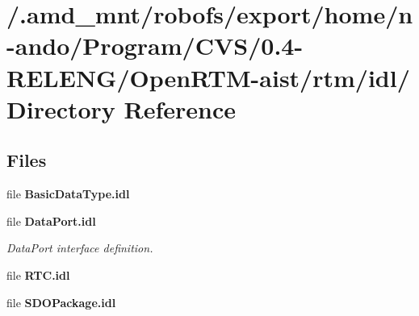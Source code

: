 \section{/.amd\_\-mnt/robofs/export/home/n-ando/Program/CVS/0.4-RELENG/Open\-RTM-aist/rtm/idl/ Directory Reference}
\label{dir_000001}
\subsection*{Files}
\begin{CompactItemize}
\item 
file {\bf Basic\-Data\-Type.idl}
\item 
file {\bf Data\-Port.idl}
\begin{CompactList}\small\item\em Data\-Port interface definition. \item\end{CompactList}

\item 
file {\bf RTC.idl}
\item 
file {\bf SDOPackage.idl}
\end{CompactItemize}
